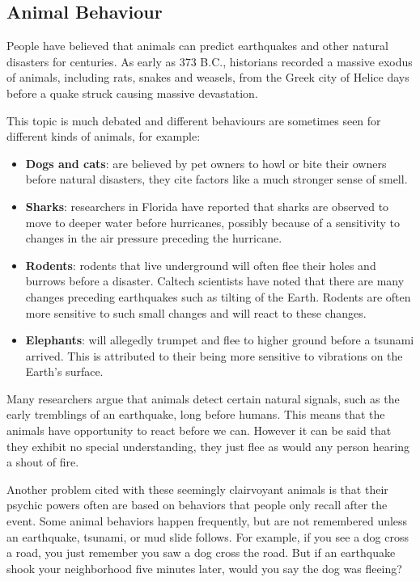     \label{m38779*eip-745}
            \subsection*{Animal Behaviour}
            \nopagebreak
            \label{m38779*id1164126080746}People have believed that animals can predict earthquakes and other natural disasters for centuries. As early as 373 B.C., historians recorded a massive exodus of animals, including rats, snakes and weasels, from the Greek city of Helice days before a quake struck causing massive devastation.\par 
      \label{m38779*id1164126439136}This topic is much debated and different behaviours are sometimes seen for different kinds of animals, for example:\par 
      \label{m38779*id1164132827593}\begin{itemize}[noitemsep]
            \item \textbf{Dogs and cats}: are believed by pet owners to howl or bite their owners before natural disasters, they cite factors like a much stronger sense of smell.
\item \textbf{Sharks}: researchers in Florida have reported that sharks are observed to move to deeper water before hurricanes, possibly because of a sensitivity to changes in the air pressure preceding the hurricane.
\item \textbf{Rodents}: rodents that live underground will often flee their holes and burrows before a disaster. Caltech scientists have noted that there are many changes preceding earthquakes such as tilting of the Earth. Rodents are often more sensitive to such small changes and will react to these changes.
\item \textbf{Elephants}: will allegedly trumpet and flee to higher ground before a tsunami arrived. This is attributed to their being more sensitive to vibrations on the Earth's surface. \end{itemize}
      \label{m38779*id1164121170251}Many researchers argue that animals detect certain natural signals, such as the early tremblings of an earthquake, long before humans. This means that the animals have opportunity to react before we can. However it can be said that they exhibit no special understanding, they just flee as would any person hearing a shout of fire.\par 
      \label{m38779*id6489198}Another problem cited with these seemingly clairvoyant animals is that their psychic powers often are based on behaviors that people only recall after the event. Some animal behaviors happen frequently, but are not remembered unless an earthquake, tsunami, or mud slide follows. For example, if you see a dog cross a road, you just remember you saw a dog cross the road. But if an earthquake shook your neighborhood five minutes later, would you say the dog was fleeing? \par 
